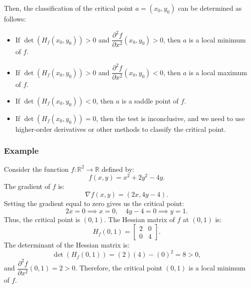 \documentclass[11pt]{article}
\begin{document}
Then, the classification of the critical point \(a = (x_0, y_0)\) can be determined as follows:
\begin{itemize}
    \item If \(\det(H_f(x_0, y_0)) > 0\) and \(\dfrac{\partial^2 f}{\partial x^2}(x_0, y_0) > 0\), then \(a\) is a local minimum of \(f\).
    \item If \(\det(H_f(x_0, y_0)) > 0\) and \(\dfrac{\partial^2 f}{\partial x^2}(x_0, y_0) < 0\), then \(a\) is a local maximum of \(f\).
    \item If \(\det(H_f(x_0, y_0)) < 0\), then \(a\) is a saddle point of \(f\).
    \item If \(\det(H_f(x_0, y_0)) = 0\), then the test is inconclusive, and we need to use higher-order derivatives or other methods to classify the critical point.
\end{itemize}

\subsubsection*{Example}
Consider the function \(f : \mathbb{R}^2 \to \mathbb{R}\) defined by:
\[f(x, y) = x^2 + 2y^2 - 4y.\]
The gradient of \(f\) is:
\[\nabla f(x, y) = (2x, 4y - 4).\]
Setting the gradient equal to zero gives us the critical point:
\[2x = 0 \implies x = 0, \quad 4y - 4 = 0 \implies y = 1.\]
Thus, the critical point is \((0, 1)\). The Hessian matrix of \(f\) at \((0, 1)\) is:
\[H_f(0, 1) = \begin{bmatrix}
2 & 0 \\
0 & 4
\end{bmatrix}.\]
The determinant of the Hessian matrix is:
\[\det(H_f(0, 1)) = (2)(4) - (0)^2 = 8 > 0,\]
and \(\dfrac{\partial^2 f}{\partial x^2}(0, 1) = 2 > 0\). Therefore, the critical point \((0, 1)\) is a local minimum of \(f\).
\end{document}
